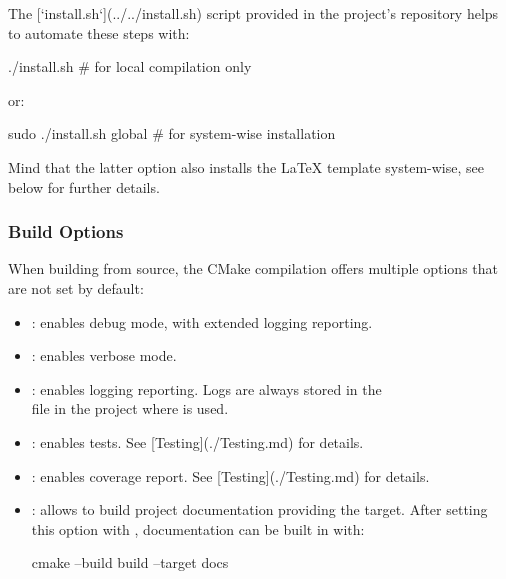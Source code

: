 \documentclass[../main.tex]{subfiles}
\begin{document}
\begin{enumerate}
        The [`install.sh`](../../install.sh) script provided in the project's repository helps to automate these steps with:

        \begin{bash}
            ./install.sh # for local compilation only
        \end{bash}

        or:

        \begin{bash}
            sudo ./install.sh global # for system-wise installation
        \end{bash}

        \begin{blueinfo}
            Mind that the latter option also installs the LaTeX template system-wise, see below for further details.
        \end{blueinfo}
\end{enumerate}

\subsubsection{Build Options}

When building from source, the CMake compilation offers multiple options that are not set by default:

\begin{itemize}
    \item {}: enables debug mode, with extended logging reporting.
    \item {}: enables verbose mode.
    \item {}: enables logging reporting. Logs are always stored in the\\  file in the project where  is used.
    \item {}: enables tests. See [Testing](./Testing.md) for details.
    \item {}: enables coverage report. See [Testing](./Testing.md) for details.
    \item {}: allows to build project documentation providing the  target. After setting this option with , documentation can be built in  with:
    
    \begin{bash}
        cmake --build build --target docs
    \end{bash}
\end{itemize}
\end{document}
